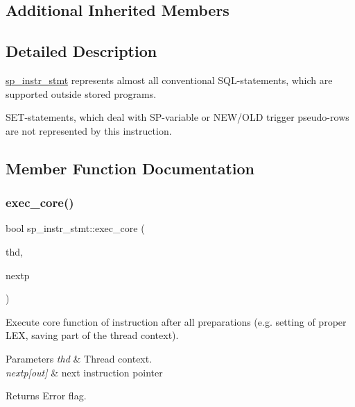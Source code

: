 \subsection*{Additional Inherited Members}


\subsection{Detailed Description}
\mbox{\hyperlink{classsp__instr__stmt}{sp\+\_\+instr\+\_\+stmt}} represents almost all conventional S\+QL-\/statements, which are supported outside stored programs.

S\+ET-\/statements, which deal with SP-\/variable or N\+E\+W/\+O\+LD trigger pseudo-\/rows are not represented by this instruction. 

\subsection{Member Function Documentation}
\mbox{\label{classsp__instr__stmt_a10255fd8768c13b35a715b78aac47b3f}} 
\subsubsection{\texorpdfstring{exec\+\_\+core()}{exec\_core()}}
{\footnotesize\ttfamily bool sp\+\_\+instr\+\_\+stmt\+::exec\+\_\+core (\begin{DoxyParamCaption}\item[{T\+HD $\ast$}]{thd,  }\item[{uint $\ast$}]{nextp }\end{DoxyParamCaption})\hspace{0.3cm}{\ttfamily [virtual]}}

Execute core function of instruction after all preparations (e.\+g. setting of proper L\+EX, saving part of the thread context).


\begin{DoxyParams}{Parameters}
{\em thd} & Thread context. \\
\hline
{\em nextp\mbox{[}out\mbox{]}} & next instruction pointer\\
\hline
\end{DoxyParams}
\begin{DoxyReturn}{Returns}
Error flag. 
\end{DoxyReturn}


